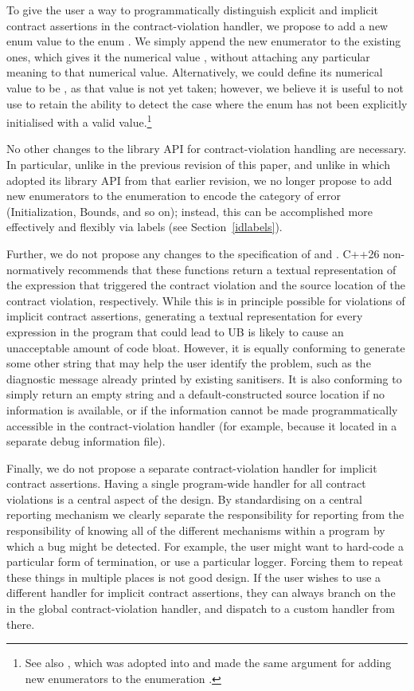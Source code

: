 To give the user a way to programmatically distinguish explicit and implicit contract assertions in the contract-violation handler, we propose to add a new enum value  to the enum \mbox{}. We simply append the new enumerator to the existing ones, which gives it the numerical value , without attaching any particular meaning to that numerical value. Alternatively, we could define its numerical value to be , as that value is not yet taken; however, we believe it is useful to not use  to retain the ability to detect the case where the enum has not been explicitly initialised with a valid value.\footnote{See also \cite{P3227R0}, which was adopted into \cite{P2900R14} and made the same argument for adding new enumerators to the enumeration .}

No other changes to the library API for contract-violation handling are necessary. In particular, unlike in the previous revision of this paper, and unlike in \cite{P3081R1} which adopted its library API from that earlier revision, we no longer propose to add new enumerators to the enumeration \mbox{} to encode the category of error (Initialization, Bounds, and so on); instead, this can be accomplished more effectively and flexibly via labels (see Section~\ref{idlabels}).

Further, we do not propose any changes to the specification of  and . C++26 non-normatively recommends that these functions return a textual representation of the expression that triggered the contract violation and the source location of the contract violation, respectively. While this is in principle possible for violations of implicit contract assertions, generating a textual representation for every expression in the program that could lead to UB is likely to cause an unacceptable amount of code bloat. However, it is equally conforming to generate some other string that may help the user identify the problem, such as the diagnostic message already printed by existing sanitisers. It is also conforming to simply return an empty string and a default-constructed source location if no information is available, or if the information cannot be made programmatically accessible in the contract-violation handler (for example,
because it located in a separate debug information file). 

Finally, we do not propose a separate contract-violation handler for implicit contract assertions. Having a single program-wide handler for all contract violations is a central aspect of the \cite{P2900R14} design. By standardising on a central reporting mechanism we clearly separate the responsibility for reporting from the responsibility of knowing all of the different mechanisms within a program by which a bug might be detected. For example, the user might want to hard-code a particular form of termination, or use a particular logger. Forcing them to repeat these things in multiple places is not good design. If the user  wishes to use a different handler for implicit contract assertions, they can always branch on the  in the global contract-violation handler, and dispatch to a custom handler from there.

